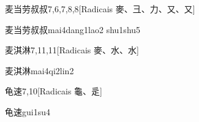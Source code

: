 \begin{entry}{麦当劳叔叔}{7,6,7,8,8}[Radicais ⿆、⼹、⼒、⼜、⼜]
  \begin{phonetics}{麦当劳叔叔}{mai4dang1lao2 shu1shu5}
  \end{phonetics}
\end{entry}

\begin{entry}{麦淇淋}{7,11,11}[Radicais ⿆、⽔、⽔]
  \begin{phonetics}{麦淇淋}{mai4qi2lin2}
  \end{phonetics}
\end{entry}

\begin{entry}{龟速}{7,10}[Radicais ⿔、⾡]
  \begin{phonetics}{龟速}{gui1su4}
  \end{phonetics}
\end{entry}


